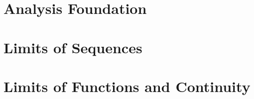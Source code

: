 \documentclass{report}
\begin{document}
	
	\thispagestyle{empty}
	\newpage%
	\tableofcontents
  

  \chapter{Analysis Foundation}
  
  \newpage
  \chapter{Limits of Sequences}
  
  \newpage
  \chapter{Limits of Functions and Continuity}


  
\end{document}
